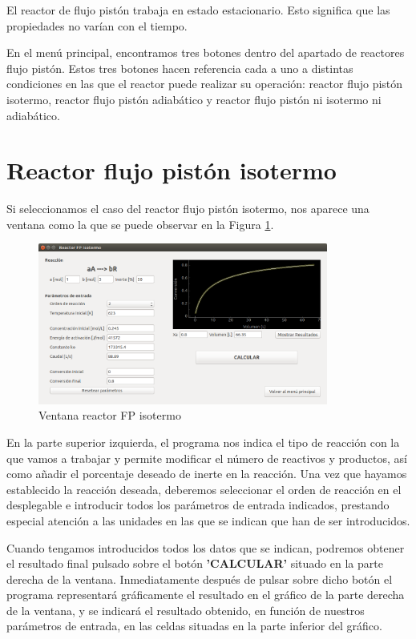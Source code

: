 	El reactor de flujo pistón trabaja en estado estacionario. Esto significa que las propiedades no varían con el tiempo.
	
	En el menú principal, encontramos tres botones dentro del apartado de reactores flujo pistón. Estos tres botones hacen referencia cada a uno a distintas condiciones en las que el reactor puede realizar su operación: reactor flujo pistón isotermo, reactor flujo pistón adiabático y reactor flujo pistón ni isotermo ni adiabático.
	
\section{Reactor flujo pistón isotermo}
Si seleccionamos el caso del reactor flujo pistón isotermo, nos aparece una ventana como la que se puede observar en la Figura \ref{fig:ventana_isotermo}.

\begin{figure}[h!]
	\begin{center}
		\includegraphics[width=0.85\textwidth]{./imagenes/reactor_fp/isotermo1.png}\caption{Ventana reactor FP isotermo}\label{fig:ventana_isotermo}
	\end{center}
\end{figure}

En la parte superior izquierda, el programa nos indica el tipo de reacción con la que vamos a trabajar y permite modificar el número de reactivos y productos, así como añadir el porcentaje deseado de inerte en la reacción. Una vez que hayamos establecido la reacción deseada, deberemos seleccionar el orden de reacción en el desplegable e introducir todos los parámetros de entrada indicados, prestando especial atención a las unidades en las que se indican que han de ser introducidos.

Cuando tengamos introducidos todos los datos que se indican, podremos obtener el resultado final pulsado sobre el botón \textbf{'CALCULAR'} situado en la parte derecha de la ventana. Inmediatamente después de pulsar sobre dicho botón el programa representará gráficamente el resultado en el gráfico de la parte derecha de la ventana, y se indicará el resultado obtenido, en función de nuestros parámetros de entrada, en las celdas situadas en la parte inferior del gráfico.

